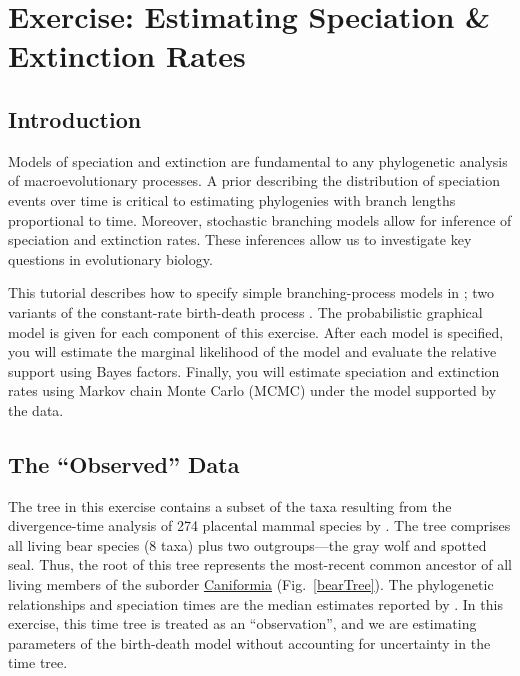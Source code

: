 \section{Exercise: Estimating Speciation \& Extinction Rates}

\subsection{Introduction}

Models of speciation and extinction are fundamental to any phylogenetic analysis of macroevolutionary processes.
A prior describing the distribution of speciation events over time is critical to estimating phylogenies with branch lengths proportional to time.
Moreover, stochastic branching models allow for inference of speciation and extinction rates.
These inferences allow us to investigate key questions in evolutionary biology.

This tutorial describes how to specify simple branching-process models in \RevBayes;
two variants of the constant-rate birth-death process \citep{yule24,Kendall1948,thompson75,nee94,rannala96,yang97b}.
The probabilistic graphical model is given for each component of this exercise.
After each model is specified, you will estimate the marginal likelihood of the model and evaluate the relative support using Bayes factors.
Finally, you will estimate speciation and extinction rates using Markov chain Monte Carlo (MCMC) under the model supported by the data.


\subsection{The ``Observed'' Data}


The tree in this exercise contains a subset of the taxa resulting from the divergence-time analysis of 274 placental mammal species by \citet{dosReis2012}. 
The tree comprises all living bear species (8 taxa) plus two outgroups---the gray wolf and spotted seal.
Thus, the root of this tree represents the most-recent common ancestor of all living members of the suborder \href{http://en.wikipedia.org/wiki/Caniformia}{Caniformia} (Fig.~\ref{bearTree}). 
The phylogenetic relationships and speciation times are the median estimates reported by \citet{dosReis2012}. 
In this exercise, this time tree is treated as an ``observation'', and we are estimating parameters of the birth-death model without accounting for uncertainty in the time tree.

